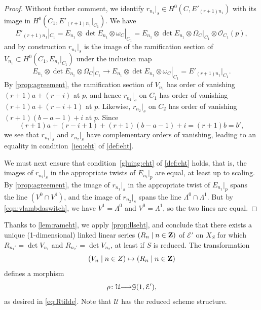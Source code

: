 \documentclass[11pt,reqno]{amsart}
\theoremstyle{plain}
\theoremstyle{definition}
\theoremstyle{remark}
\numberwithin{equation}{section}
\renewcommand{\to}{{\longrightarrow}}
\numberwithin{equation}{section}
\renewcommand{\O}{\mathcal O}
\begin{document}
\begin{proof}
  Without further comment, we identify $r_{n_1}|_s \in H^0(C, E'_{(r+1)n_1})$ with its image in $H^0(C_1, E'_{(r+1)n_1}|_{C_1})$.
  We have
  \[E'_{(r+1)n_1}|_{C_1} = E_{n_1} \otimes \det E_{n_1} \otimes \omega_C|_{C_1} = E_{n_1} \otimes \det E_{n_1} \otimes \Omega_C|_{C_1} \otimes \O_{C_1}(p),\]
  and by construction $r_{n_1}|_s$ is the image of the ramification section of $V_{n_1} \subset H^0(C_1, E_{n_1}|_{C_1})$ under the inclusion map
  \[ E_{n_1} \otimes \det E_{n_1} \otimes \Omega_C|_{C_1} \to E_{n_1} \otimes \det E_{n_1} \otimes \omega_C|_{C_1} = E'_{(r+1)n_1}|_{C_1}.\]
  By \autoref{prop:agreement}, the ramification section of $V_{n_1}$ has order of vanishing $(r+1)a+(r-i)$ at $p$, and hence $r_{n_1}|_s$ on $C_1$ has order of vanishing $(r+1)a+(r-i+1)$ at $p$.
  Likewise, $r_{n_2}|_s$ on $C_2$ has order of vanishing $(r+1)(b-a-1)+i$ at $p$.
  Since
  \[ (r+1)a+(r-i+1) + (r+1)(b-a-1) + i = (r+1)b = b',\]
  we see that $r_{n_1}|_s$ and $r_{n_2}|_s$ have complementary orders of vanishing, leading to an equality in condition~\eqref{ieq:eht} of \autoref{def:eht}.

  We must next ensure that condition~\eqref{gluing:eht} of \autoref{def:eht} holds, that is, the images of $r_{n_i}|_s$ in the appropriate twists of $E_{n_i}|_p$ are equal, at least up to scaling.
  By \autoref{prop:agreement}, the image of $r_{n_1}|_s$ in the appropriate twist of $E_{n_1}|_p$ spans the line $(V^0 \cap V^1)$, and the image of $r_{n_2}|_s$ spans the line $\Lambda^0 \cap \Lambda^1$.
  But by \eqref{eqn:vlambdaswitch}, we have $V^1 = \Lambda^0$ and $V^0 = \Lambda^1$, so the two lines are equal.
\end{proof}

Thanks to \autoref{lem:rameht}, we apply \autoref{prop:llseht}, and conclude that there exists a unique (1-dimensional) linked linear series $(R_n \mid n \in {\bf Z})$ of $\mathcal E'$ on $X_S$ for which $R_{n_1'} = \det V_{n_1}$ and $R_{n_2'} = \det V_{n_2}$, at least if $S$ is reduced.
The transformation
\[ (V_n \mid n \in Z) \mapsto (R_n \mid n \in {\bf Z})\]
defines a morphism
\begin{equation}\label{prop:mapreduced}
  \rho \from \mathcal U \to \mathcal G(1, \mathcal E'),
\end{equation}
as desired in \eqref{eq:Rtilde}.
Note that $\mathcal U$ has the reduced scheme structure.
\end{document}
